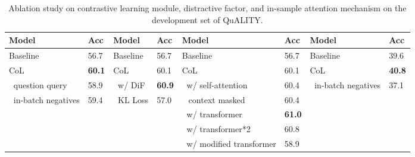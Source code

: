 \begin{table}\scriptsize
    \centering
    \begin{tabular}{ll|ll|ll|ll}
    \hline
    {\bfseries Model} & {\bfseries Acc} & {\bfseries Model} & {\bfseries Acc} & {\bfseries Model} & {\bfseries Acc} & {\bfseries Model} & {\bfseries Acc} \\
    \hline
    Baseline & 56.7 & Baseline & 56.7 & Baseline & 56.7 & Baseline & 39.6 \\
    \hline
    CoL & {\bfseries 60.1} & CoL & 60.1 & CoL & 60.1 & CoL & {\bfseries 40.8} \\
    \hline
    $\ $ question query & 58.9 & $\ $ w/ DiF & {\bfseries 60.9} & $\ $ w/ self-attention & 60.4 & $\ $ in-batch negatives & 37.1 \\
    $\ $ in-batch negatives & 59.4 & $\ $ KL Loss & 57.0 & $\ \ $ context masked & 60.4 & \\
    & & & & $\ $ w/ transformer & {\bfseries 61.0} & & \\
    & & & & $\ $ w/ transformer*2 & 60.8 & & \\
    & & & & $\ $ w/ modified transformer & 58.9 & & \\
    \hline
    \end{tabular}
    \caption{\label{tab:4-4}
    Ablation study on contrastive learning module, distractive factor, and in-sample attention mechanism on the development set of QuALITY.
    }
\end{table}

